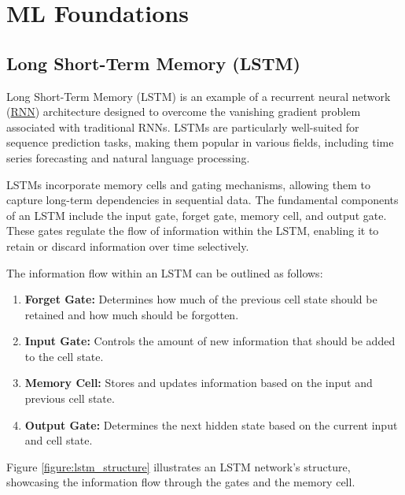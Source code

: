 \documentclass[a4paper,10pt]{article}
\begin{document}



\appendix

\section{ML Foundations}

\subsection{Long Short-Term Memory (LSTM)}\label{appx:lstm}

Long Short-Term Memory (LSTM) is an example of a recurrent neural network (\hyperref[appx:rnn]{RNN}) architecture designed to overcome the vanishing gradient problem associated with traditional RNNs. LSTMs are particularly well-suited for sequence prediction tasks, making them popular in various fields, including time series forecasting and natural language processing.

LSTMs incorporate memory cells and gating mechanisms, allowing them to capture long-term dependencies in sequential data. The fundamental components of an LSTM include the input gate, forget gate, memory cell, and output gate. These gates regulate the flow of information within the LSTM, enabling it to retain or discard information over time selectively.

The information flow within an LSTM can be outlined as follows:

\begin{enumerate}
  \item \textbf{Forget Gate:} Determines how much of the previous cell state should be retained and how much should be forgotten.

  \item \textbf{Input Gate:} Controls the amount of new information that should be added to the cell state.

  \item \textbf{Memory Cell:} Stores and updates information based on the input and previous cell state.

  \item \textbf{Output Gate:} Determines the next hidden state based on the current input and cell state.

\end{enumerate}

Figure \ref{figure:lstm_structure} illustrates an LSTM network's structure, showcasing the information flow through the gates and the memory cell.
\end{document}
